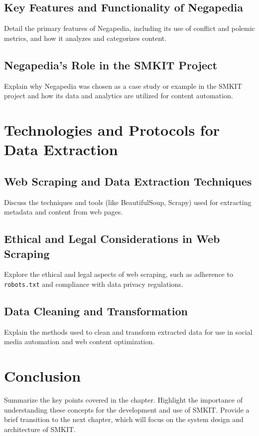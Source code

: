 \subsection{Key Features and Functionality of Negapedia}
\label{subsec:key_features_and_functionality_of_negapedia}
Detail the primary features of Negapedia, including its use of conflict and polemic metrics, and how it analyzes and categorizes content.

\subsection{Negapedia's Role in the SMKIT Project}
\label{subsec:negapedia_s_role_in_the_smkit_project}
Explain why Negapedia was chosen as a case study or example in the SMKIT project and how its data and analytics are utilized for content automation.

\section{Technologies and Protocols for Data Extraction}
\label{sec:technologies_and_protocols_for_data_extraction}

\subsection{Web Scraping and Data Extraction Techniques}
\label{subsec:web_scraping_and_data_extraction_techniques}
Discuss the techniques and tools (like BeautifulSoup, Scrapy) used for extracting metadata and content from web pages.

\subsection{Ethical and Legal Considerations in Web Scraping}
\label{subsec:ethical_and_legal_considerations_in_web_scraping}
Explore the ethical and legal aspects of web scraping, such as adherence to \texttt{robots.txt} and compliance with data privacy regulations.

\subsection{Data Cleaning and Transformation}
\label{subsec:data_cleaning_and_transformation}
Explain the methods used to clean and transform extracted data for use in social media automation and web content optimization.

\section{Conclusion}
\label{sec:preliminaries_conclusion}
Summarize the key points covered in the chapter.
Highlight the importance of understanding these concepts for the development and use of SMKIT. Provide a brief transition to the next chapter, which will focus on the system design and architecture of SMKIT.
